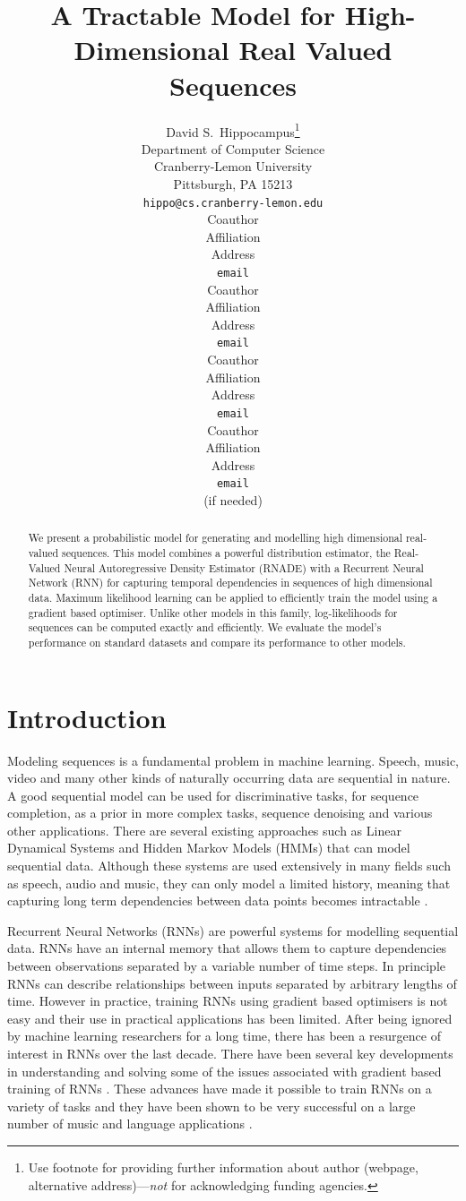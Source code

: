 \documentclass{article} %
\title{A Tractable Model for High-Dimensional Real Valued Sequences}
\author{
David S.~Hippocampus\thanks{ Use footnote for providing further information
about author (webpage, alternative address)---\emph{not} for acknowledging
funding agencies.} \\
Department of Computer Science\\
Cranberry-Lemon University\\
Pittsburgh, PA 15213 \\
\texttt{hippo@cs.cranberry-lemon.edu} \\
\And
Coauthor \\
Affiliation \\
Address \\
\texttt{email} \\
\AND
Coauthor \\
Affiliation \\
Address \\
\texttt{email} \\
\And
Coauthor \\
Affiliation \\
Address \\
\texttt{email} \\
\And
Coauthor \\
Affiliation \\
Address \\
\texttt{email} \\
(if needed)\\
}
\begin{document}
\maketitle

\begin{abstract}
We present a probabilistic model for generating and modelling high dimensional real-valued sequences. This model combines a powerful distribution estimator, the Real-Valued Neural Autoregressive Density Estimator (RNADE) with a Recurrent Neural Network (RNN) for capturing temporal dependencies in sequences of high dimensional data. Maximum likelihood learning can be applied to efficiently train the model using a gradient based optimiser. Unlike other models in this family, log-likelihoods for sequences can be computed exactly and efficiently. We evaluate the model's performance on standard datasets and compare its performance to other models. 
\end{abstract}

\section{Introduction}
\label{intro}
Modeling sequences is a fundamental problem in machine learning. Speech, music, video and many other kinds of naturally occurring data are sequential in nature. A good sequential model can be used for discriminative tasks, for sequence completion, as a prior in more complex tasks, sequence denoising and various other applications. There are several existing approaches such as Linear Dynamical Systems and Hidden Markov Models (HMMs) that can model sequential data. Although these systems are used extensively in many fields such as speech, audio and music, they can only model a limited history, meaning that capturing long term dependencies between data points becomes intractable \cite{sutskever2007learning}. 

Recurrent Neural Networks (RNNs) are powerful systems for modelling sequential data. RNNs have an internal memory that allows them to capture dependencies between observations separated by a variable number of time steps. In principle RNNs can describe relationships between inputs separated by arbitrary lengths of time. However in practice, training RNNs using gradient based optimisers is not easy and their use in practical applications has been limited. After being ignored by machine learning researchers for a long time, there has been a resurgence of interest in RNNs over the last decade. There have been several key developments in understanding and solving some of the issues associated with gradient based training of RNNs \cite{Martens2011,bengio2012advances}. These advances have made it possible to train RNNs on a variety of tasks and they have been shown to be very successful on a large number of music and language applications \cite{mikolov2011empirical,Boulanger-Lewandowski2012,bengio2012advances}. 
\end{document}
